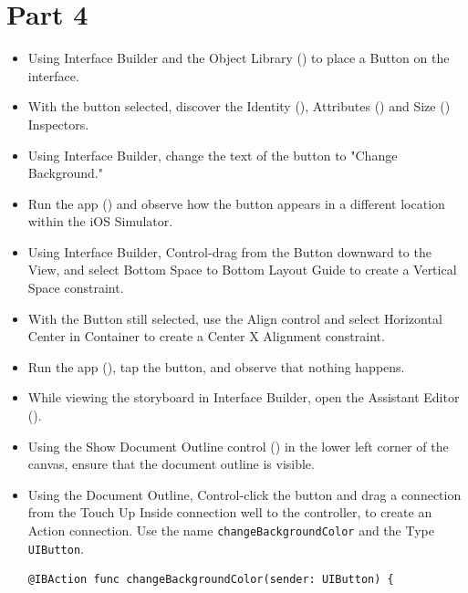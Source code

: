 \documentclass[a4paper,11pt]{scrartcl}
\begin{document}
\section*{Part 4}

\begin{itemize}
\item Using Interface Builder and the Object Library () to place a Button on the interface.
\item With the button selected, discover the Identity (), Attributes () and Size () Inspectors.
\item Using Interface Builder, change the text of the button to "Change Background."
\item Run the app () and observe how the button appears in a different location within the iOS Simulator.
\item Using Interface Builder, Control-drag from the Button downward to the View, and select Bottom Space to Bottom Layout Guide to create a Vertical Space constraint.
\item With the Button still selected, use the Align control and select Horizontal Center in Container to create a Center X Alignment constraint.
\item Run the app (), tap the button, and observe that nothing happens.
\item While viewing the storyboard in Interface Builder, open the Assistant Editor (\keys{\Alt+\cmd+\return}).
\item Using the Show Document Outline control () in the lower left corner of the canvas, ensure that the document outline is visible.
\item Using the Document Outline, Control-click the button and drag a connection from the Touch Up Inside connection well to the controller, to create an Action connection. Use the name \texttt{changeBackgroundColor} and the Type \texttt{UIButton}.
\begin{lstlisting}
@IBAction func changeBackgroundColor(sender: UIButton) {


\end{lstlisting}
\end{itemize}
\end{document}
